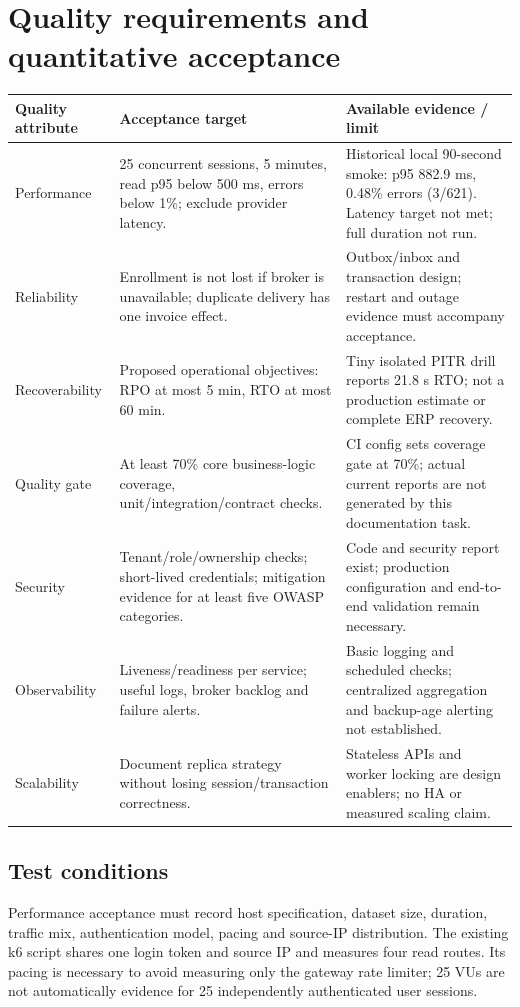 \documentclass[10pt,a4paper]{article}
\begin{document}
\clearpage
\section{Quality requirements and quantitative acceptance}
\begin{tabularx}{\textwidth}{@{}L{31mm}Y Y@{}}
\toprule Quality attribute & Acceptance target & Available evidence / limit\\\midrule
Performance & 25 concurrent sessions, 5 minutes, read p95 below 500 ms, errors below 1\%; exclude provider latency. & Historical local 90-second smoke: p95 882.9 ms, 0.48\% errors (3/621). Latency target not met; full duration not run.\\
Reliability & Enrollment is not lost if broker is unavailable; duplicate delivery has one invoice effect. & Outbox/inbox and transaction design; restart and outage evidence must accompany acceptance.\\
Recoverability & Proposed operational objectives: RPO at most 5 min, RTO at most 60 min. & Tiny isolated PITR drill reports 21.8 s RTO; not a production estimate or complete ERP recovery.\\
Quality gate & At least 70\% core business-logic coverage, unit/integration/contract checks. & CI config sets coverage gate at 70\%; actual current reports are not generated by this documentation task.\\
Security & Tenant/role/ownership checks; short-lived credentials; mitigation evidence for at least five OWASP categories. & Code and security report exist; production configuration and end-to-end validation remain necessary.\\
Observability & Liveness/readiness per service; useful logs, broker backlog and failure alerts. & Basic logging and scheduled checks; centralized aggregation and backup-age alerting not established.\\
Scalability & Document replica strategy without losing session/transaction correctness. & Stateless APIs and worker locking are design enablers; no HA or measured scaling claim.\\
\bottomrule
\end{tabularx}
\subsection{Test conditions}
Performance acceptance must record host specification, dataset size, duration,
traffic mix, authentication model, pacing and source-IP distribution. The existing
k6 script shares one login token and source IP and measures four read routes.
Its pacing is necessary to avoid measuring only the gateway rate limiter; 25 VUs
are not automatically evidence for 25 independently authenticated user sessions.
\end{document}
